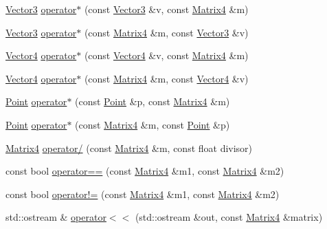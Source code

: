\begin{DoxyCompactItemize}
\item 
\hyperlink{classprism_1_1geometry_1_1_vector3}{Vector3} \hyperlink{classprism_1_1geometry_1_1_matrix4_ada37b2462427325427c6503a1a370d40}{operator$\ast$} (const \hyperlink{classprism_1_1geometry_1_1_vector3}{Vector3} \&v, const \hyperlink{classprism_1_1geometry_1_1_matrix4}{Matrix4} \&m)
\item 
\hyperlink{classprism_1_1geometry_1_1_vector3}{Vector3} \hyperlink{classprism_1_1geometry_1_1_matrix4_acb4d5cf5c35ead4ac8d2713d32a3bb53}{operator$\ast$} (const \hyperlink{classprism_1_1geometry_1_1_matrix4}{Matrix4} \&m, const \hyperlink{classprism_1_1geometry_1_1_vector3}{Vector3} \&v)
\item 
\hyperlink{classprism_1_1geometry_1_1_vector4}{Vector4} \hyperlink{classprism_1_1geometry_1_1_matrix4_a8f72f1280f8f44f2f85c32e930ef95f1}{operator$\ast$} (const \hyperlink{classprism_1_1geometry_1_1_vector4}{Vector4} \&v, const \hyperlink{classprism_1_1geometry_1_1_matrix4}{Matrix4} \&m)
\item 
\hyperlink{classprism_1_1geometry_1_1_vector4}{Vector4} \hyperlink{classprism_1_1geometry_1_1_matrix4_a20a9788aba6ec37d10a0c04fa479b26e}{operator$\ast$} (const \hyperlink{classprism_1_1geometry_1_1_matrix4}{Matrix4} \&m, const \hyperlink{classprism_1_1geometry_1_1_vector4}{Vector4} \&v)
\item 
\hyperlink{classprism_1_1geometry_1_1_point}{Point} \hyperlink{classprism_1_1geometry_1_1_matrix4_a00876fb2e95ed93d05c590a941d2c3a3}{operator$\ast$} (const \hyperlink{classprism_1_1geometry_1_1_point}{Point} \&p, const \hyperlink{classprism_1_1geometry_1_1_matrix4}{Matrix4} \&m)
\item 
\hyperlink{classprism_1_1geometry_1_1_point}{Point} \hyperlink{classprism_1_1geometry_1_1_matrix4_a67263983148d3a3593ebc84eae31c87a}{operator$\ast$} (const \hyperlink{classprism_1_1geometry_1_1_matrix4}{Matrix4} \&m, const \hyperlink{classprism_1_1geometry_1_1_point}{Point} \&p)
\item 
\hyperlink{classprism_1_1geometry_1_1_matrix4}{Matrix4} \hyperlink{classprism_1_1geometry_1_1_matrix4_a9370aa111e71140fdd85f3e055a26cbd}{operator/} (const \hyperlink{classprism_1_1geometry_1_1_matrix4}{Matrix4} \&m, const float divisor)
\item 
const bool \hyperlink{classprism_1_1geometry_1_1_matrix4_a0cbf3c575d1951cc9ae4dfe79c3a3729}{operator==} (const \hyperlink{classprism_1_1geometry_1_1_matrix4}{Matrix4} \&m1, const \hyperlink{classprism_1_1geometry_1_1_matrix4}{Matrix4} \&m2)
\item 
const bool \hyperlink{classprism_1_1geometry_1_1_matrix4_aaedc2ff7fd572ebc03eec59fb11cd5a9}{operator!=} (const \hyperlink{classprism_1_1geometry_1_1_matrix4}{Matrix4} \&m1, const \hyperlink{classprism_1_1geometry_1_1_matrix4}{Matrix4} \&m2)
\item 
std\+::ostream \& \hyperlink{classprism_1_1geometry_1_1_matrix4_a4ccbb04098ce491412da339e07eb72d7}{operator$<$$<$} (std\+::ostream \&out, const \hyperlink{classprism_1_1geometry_1_1_matrix4}{Matrix4} \&matrix)
\end{DoxyCompactItemize}


